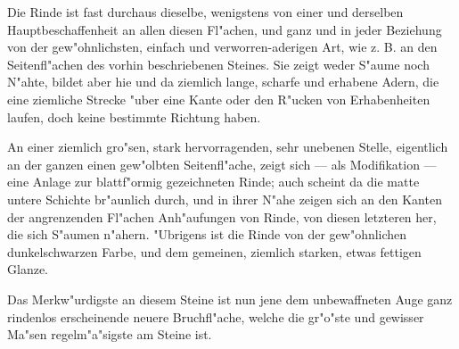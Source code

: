 \documentclass[a4paper, 11pt, oneside, german]{article}
\begin{document}
Die Rinde ist fast durchaus dieselbe, wenigstens von einer und derselben Hauptbeschaffenheit an allen diesen Fl"achen, und ganz und in jeder Beziehung von der gew"ohnlichsten, einfach und verworren-aderigen Art, wie z. B. an den Seitenfl"achen des vorhin beschriebenen Steines. Sie zeigt weder S"aume noch N"ahte, bildet aber hie und da ziemlich lange, scharfe und erhabene Adern, die eine ziemliche Strecke "uber eine Kante oder den R"ucken von Erhabenheiten laufen, doch keine bestimmte Richtung haben.

An einer ziemlich gro"sen, stark hervorragenden, sehr unebenen Stelle, eigentlich an der ganzen einen gew"olbten Seitenfl"ache, zeigt sich --- als Modifikation --- eine Anlage zur blattf"ormig gezeichneten Rinde; auch scheint da die matte untere Schichte br"aunlich durch, und in ihrer N"ahe zeigen sich an den Kanten der angrenzenden Fl"achen Anh"aufungen von Rinde, von diesen letzteren her, die sich S"aumen n"ahern. "Ubrigens ist die Rinde von der gew"ohnlichen dunkelschwarzen Farbe, und dem gemeinen, ziemlich starken, etwas fettigen Glanze.

Das Merkw"urdigste an diesem Steine ist nun jene dem unbewaffneten Auge ganz rindenlos erscheinende neuere Bruchfl"ache, welche die gr"o"ste und gewisser Ma"sen regelm"a"sigste am Steine ist.
\end{document}
